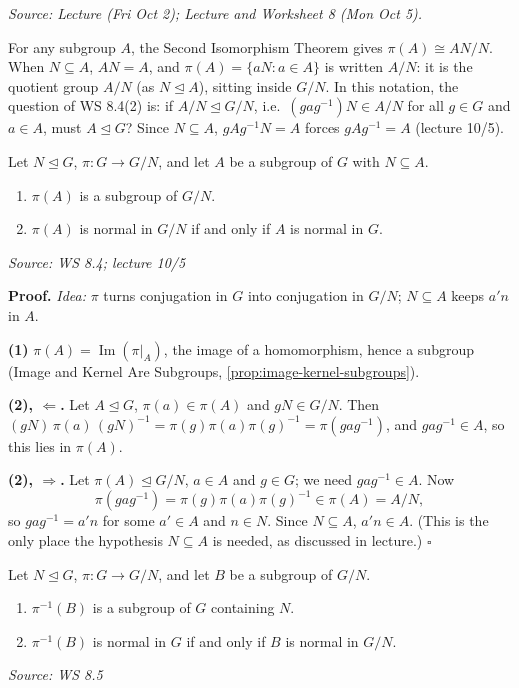 \documentclass[11pt]{report}
\renewenvironment{proof}[1][Proof]{\noindent\textbf{#1.} }{\hfill$\square$\par\vspace{5pt}}
\newcommand{\srcline}[1]{\par\hfill{\footnotesize\textit{Source: #1}}}
\begin{document}
\textit{Source: Lecture (Fri Oct 2); Lecture and Worksheet 8 (Mon Oct 5).}

\begin{rembox}[{Notation $A/N$}]\label{rem:notation-a-n}
For any subgroup $A$, the Second Isomorphism Theorem gives $\pi(A) \cong AN/N$. When $N \subseteq A$, $AN = A$, and $\pi(A) = \{aN : a \in A\}$ is written $A/N$: it is the quotient group $A/N$ (as $N \trianglelefteq A$), sitting inside $G/N$. In this notation, the question of WS 8.4(2) is: if $A/N \trianglelefteq G/N$, i.e.\ $(gag^{-1})N \in A/N$ for all $g \in G$ and $a \in A$, must $A \trianglelefteq G$? Since $N \subseteq A$, $gAg^{-1}N = A$ forces $gAg^{-1} = A$ (lecture 10/5).
\end{rembox}

\begin{propbox}\label{prop:images-subgroups-containing-n}
Let $N \trianglelefteq G$, $\pi: G \to G/N$, and let $A$ be a subgroup of $G$ with $N \subseteq A$.
\begin{enumerate}
    \item $\pi(A)$ is a subgroup of $G/N$.
    \item $\pi(A)$ is normal in $G/N$ if and only if $A$ is normal in $G$.
\end{enumerate}
\srcline{WS 8.4; lecture 10/5}
\end{propbox}

\begin{proof}
\textit{Idea:} $\pi$ turns conjugation in $G$ into conjugation in $G/N$; $N \subseteq A$ keeps $a'n$ in $A$.\par
\textbf{(1)} $\pi(A) = \operatorname{Im}(\pi|_A)$, the image of a homomorphism, hence a subgroup (Image and Kernel Are Subgroups, \ref{prop:image-kernel-subgroups}).

\textbf{(2), $\Leftarrow$.} Let $A \trianglelefteq G$, $\pi(a) \in \pi(A)$ and $gN \in G/N$. Then $(gN)\,\pi(a)\,(gN)^{-1} = \pi(g)\pi(a)\pi(g)^{-1} = \pi(gag^{-1})$, and $gag^{-1} \in A$, so this lies in $\pi(A)$.

\textbf{(2), $\Rightarrow$.} Let $\pi(A) \trianglelefteq G/N$, $a \in A$ and $g \in G$; we need $gag^{-1} \in A$. Now
\[ \pi(gag^{-1}) = \pi(g)\pi(a)\pi(g)^{-1} \in \pi(A) = A/N, \] so $gag^{-1} = a'n$ for some $a' \in A$ and $n \in N$. Since $N \subseteq A$, $a'n \in A$. (This is the only place the hypothesis $N \subseteq A$ is needed, as discussed in lecture.)
\end{proof}

\begin{propbox}\label{prop:preimages-subgroups-quotient}
Let $N \trianglelefteq G$, $\pi: G \to G/N$, and let $B$ be a subgroup of $G/N$.
\begin{enumerate}
    \item $\pi^{-1}(B)$ is a subgroup of $G$ containing $N$.
    \item $\pi^{-1}(B)$ is normal in $G$ if and only if $B$ is normal in $G/N$.
\end{enumerate}
\srcline{WS 8.5}
\end{propbox}
\end{document}

